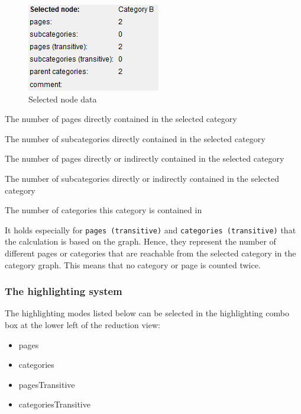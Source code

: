 \documentclass{scrartcl}
\begin{document}
\begin{figure}[h]
\centering
\includegraphics[scale=0.7]{figures/node_data.png}
\caption{Selected node data}
\label{fig:node_data}
\end{figure}

\begin{description}
\small
\item[pages] The number of pages directly contained in the selected category
\item[categories] The number of subcategories directly contained in the selected category
\item[pages (transitive)] The number of pages directly or indirectly contained in the selected category
\item[categories (transitive)] The number of subcategories directly or indirectly contained in the selected category
\item[parent categories] The number of categories this category is contained in
\end{description}

It holds especially for \texttt{pages (transitive)} and \texttt{categories (transitive)} that the calculation is based on the graph. Hence, they represent the number of different pages or categories that are reachable from the selected category in the category graph. This means that no category or page is counted twice.

\subsubsection{The highlighting system}

The highlighting modes listed below can be selected in the highlighting combo box at the lower left of the reduction view:

\begin{itemize}
	\item pages 
	\item categories
	\item pagesTransitive
	\item categoriesTransitive
\end{itemize}
\end{document}
